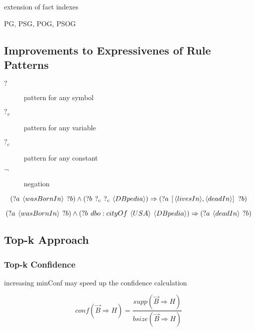 extension of fact indexes

PG, PSG, POG, PSOG

\subsection{Improvements to Expressivenes of Rule Patterns}

\begin{description}
\item[$?$] pattern for any symbol
\item[$?_{v}$] pattern for any variable
\item[$?_{c}$] pattern for any constant
\item[$\neg$] negation
\end{description}

$$(?a\hspace{0.4em}\langle wasBornIn \rangle\hspace{0.4em}?b) \land (?b\hspace{0.4em}?_{c}\hspace{0.4em}?_{c} \hspace{0.4em} \langle DBpedia \rangle) \Rightarrow (?a\hspace{0.4em}[ \,\langle livesIn \rangle,\langle deadIn \rangle	] \,\hspace{0.4em}?b)$$

$$(?a\hspace{0.4em}\langle wasBornIn \rangle\hspace{0.4em}?b) \land (?b\hspace{0.4em}dbo:cityOf\hspace{0.4em}\langle USA \rangle \hspace{0.4em} \langle DBpedia \rangle) \Rightarrow (?a\hspace{0.4em} \langle deadIn \rangle\hspace{0.4em}?b)$$

\subsection{Top-k Approach}


\subsubsection{Top-k Confidence}

increasing minConf may speed up the confidence calculation

$$conf(\vec{B}\Rightarrow H) = \frac{supp(\vec{B}\Rightarrow H)}{bsize(\vec{B}\Rightarrow H)} $$


